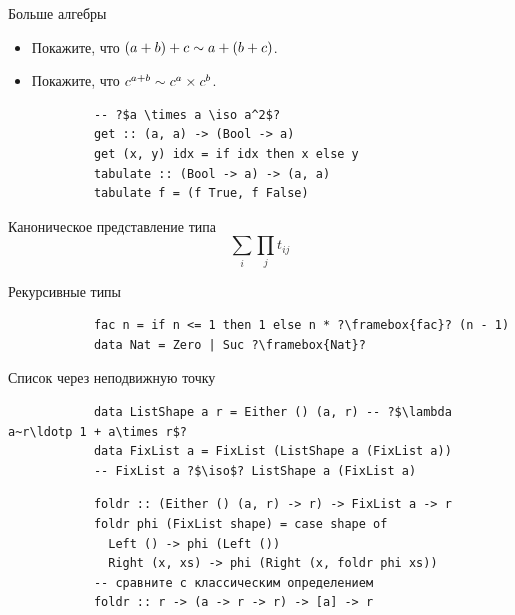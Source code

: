     \begin{frame}[fragile]{Больше алгебры}
        \pause
        \begin{itemize}
            \item[\todo] Покажите, что $(a + b) + c \sim a + (b + c)$.
            \item[\todo] Покажите, что $c^{a + b} \sim c^a\times c^b$.
        \end{itemize}
        \pause\vspace{1em}
        \begin{verbatim}
            -- ?$a \times a \iso a^2$?
            get :: (a, a) -> (Bool -> a)
            get (x, y) idx = if idx then x else y
            tabulate :: (Bool -> a) -> (a, a)
            tabulate f = (f True, f False)
        \end{verbatim}
    \end{frame}

    \begin{frame}[fragile]{Каноническое представление типа}
        \pause
        \[
            \sum_{i}\prod_{j} t_{ij}
        \]
    \end{frame}


    \begin{frame}[fragile]{Рекурсивные типы}
        \begin{verbatim}
            fac n = if n <= 1 then 1 else n * ?\framebox{fac}? (n - 1)
            data Nat = Zero | Suc ?\framebox{Nat}?
        \end{verbatim}
    \end{frame}

    \begin{frame}[fragile]{Список через неподвижную точку}
        \pause
        \begin{verbatim}
            data ListShape a r = Either () (a, r) -- ?$\lambda a~r\ldotp 1 + a\times r$?
            data FixList a = FixList (ListShape a (FixList a))
            -- FixList a ?$\iso$? ListShape a (FixList a)
        \end{verbatim}
        \vspace{1em}
        \pause
        \begin{verbatim}
            foldr :: (Either () (a, r) -> r) -> FixList a -> r
            foldr phi (FixList shape) = case shape of
              Left () -> phi (Left ())
              Right (x, xs) -> phi (Right (x, foldr phi xs))
            -- сравните с классическим определением
            foldr :: r -> (a -> r -> r) -> [a] -> r
        \end{verbatim}
    \end{frame}

